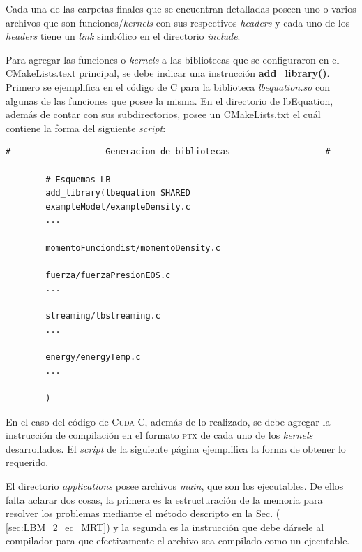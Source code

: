 Cada una de las carpetas finales que se encuentran detalladas poseen uno o varios archivos que son funciones/\textit{kernels} con sus respectivos \textit{headers} y cada uno de los \textit{headers} tiene un \textit{link} simbólico en el directorio \textit{include}.

Para agregar las funciones o \textit{kernels} a las bibliotecas que se configuraron en el CMakeLists.text principal, se debe indicar una instrucción \textbf{add\_library()}. Primero se ejemplifica en el código de \textsc{C} para la biblioteca \textit{lbequation.so} con algunas de las funciones que posee la misma. En el directorio de lbEquation, además de contar con sus subdirectorios, posee un CMakeLists.txt el cuál contiene la forma del siguiente \textit{script}:

{\footnotesize
	\begin{frame}{}
		\begin{lstlisting}[frame=single]
#------------------ Generacion de bibliotecas ------------------#
		
		# Esquemas LB
		add_library(lbequation SHARED 
		exampleModel/exampleDensity.c
		...
		
		momentoFunciondist/momentoDensity.c
		
		fuerza/fuerzaPresionEOS.c
		...
		
		streaming/lbstreaming.c
		...
		
		energy/energyTemp.c
		...
		
		)
		\end{lstlisting}
		
	\end{frame}
}

En el caso del código de \textsc{Cuda C}, además de lo realizado, se debe agregar la instrucción de compilación en el formato \textsc{ptx} de cada uno de los \textit{kernels} desarrollados. El \textit{script} de la siguiente página ejemplifica la forma de obtener lo requerido.

El directorio \textit{applications} posee archivos \textit{main}, que son los ejecutables. De ellos falta aclarar dos cosas, la primera es la estructuración de la memoria para resolver los problemas mediante el método descripto en la Sec. ( \ref{sec:LBM_2_ec_MRT}) y la segunda es la instrucción que debe dársele al compilador para que efectivamente el archivo sea compilado como un ejecutable.

